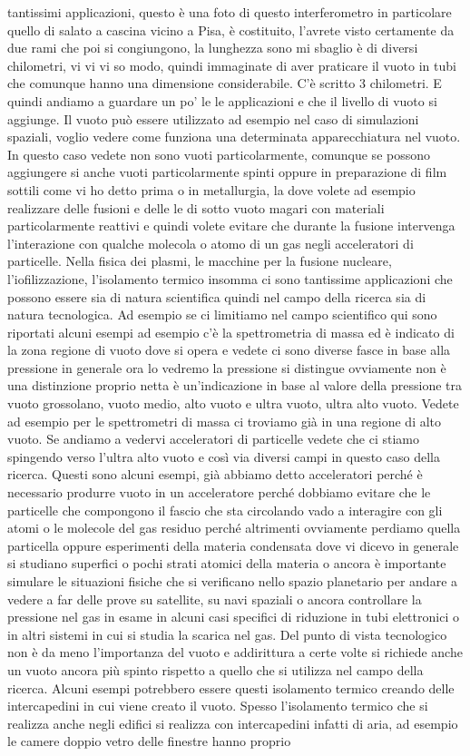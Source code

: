 tantissimi applicazioni, questo è una foto di questo interferometro in particolare quello di salato a cascina vicino a Pisa, è costituito, l'avrete visto certamente da due rami che poi si congiungono, la lunghezza sono mi sbaglio è di diversi chilometri, vi vi vi so modo, quindi immaginate di aver praticare il vuoto in tubi che comunque hanno una dimensione considerabile. C'è scritto 3 chilometri. E quindi andiamo a guardare un po' le le applicazioni e che il livello di vuoto si aggiunge. Il vuoto può essere utilizzato ad esempio nel caso di simulazioni spaziali, voglio vedere come funziona una determinata apparecchiatura nel vuoto. In questo caso vedete non sono vuoti particolarmente, comunque se possono aggiungere si anche vuoti particolarmente spinti oppure in preparazione di film sottili come vi ho detto prima o in metallurgia, la dove volete ad esempio realizzare delle fusioni e delle le di sotto vuoto magari con materiali particolarmente reattivi e quindi volete evitare che durante la fusione intervenga l'interazione con qualche molecola o atomo di un gas negli acceleratori di particelle. Nella fisica dei plasmi, le macchine per la fusione nucleare, l'iofilizzazione, l'isolamento termico insomma ci sono tantissime applicazioni che possono essere sia di natura scientifica quindi nel campo della ricerca sia di natura tecnologica. Ad esempio se ci limitiamo nel campo scientifico qui sono riportati alcuni esempi ad esempio c'è la spettrometria di massa ed è indicato di la zona regione di vuoto dove si opera e vedete ci sono diverse fasce in base alla pressione in generale ora lo vedremo la pressione si distingue ovviamente non è una distinzione proprio netta è un'indicazione in base al valore della pressione tra vuoto grossolano, vuoto medio, alto vuoto e ultra vuoto, ultra alto vuoto. Vedete ad esempio per le spettrometri di massa ci troviamo già in una regione di alto vuoto. Se andiamo a vedervi acceleratori di particelle vedete che ci stiamo spingendo verso l'ultra alto vuoto e così via diversi campi in questo caso della ricerca. Questi sono alcuni esempi, già abbiamo detto acceleratori perché è necessario produrre vuoto in un acceleratore perché dobbiamo evitare che le particelle che compongono il fascio che sta circolando vado a interagire con gli atomi o le molecole del gas residuo perché altrimenti ovviamente perdiamo quella particella oppure esperimenti della materia condensata dove vi dicevo in generale si studiano superfici o pochi strati atomici della materia o ancora è importante simulare le situazioni fisiche che si verificano nello spazio planetario per andare a vedere a far delle prove su satellite, su navi spaziali o ancora controllare la pressione nel gas in esame in alcuni casi specifici di riduzione in tubi elettronici o in altri sistemi in cui si studia la scarica nel gas. Del punto di vista tecnologico non è da meno l'importanza del vuoto e addirittura a certe volte si richiede anche un vuoto ancora più spinto rispetto a quello che si utilizza nel campo della ricerca. Alcuni esempi potrebbero essere questi isolamento termico creando delle intercapedini in cui viene creato il vuoto. Spesso l'isolamento termico che si realizza anche negli edifici si realizza con intercapedini infatti di aria, ad esempio le camere doppio vetro delle finestre hanno proprio 
